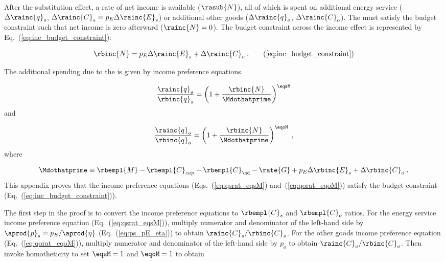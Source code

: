 

After the substitution effect, 
a rate of net income is available ($\rasub{N}$), 
all of which is spent on
additional energy service ($\Delta \rainc{q}_s$, $\Delta \rainc{C}_s = p_E \Delta \rainc{E}_s$) or 
additional other goods ($\Delta \rainc{q}_o$, $\Delta \rainc{C}_o$).
The \inceffect{} must satisfy the budget constraint
such that net income is zero afterward ($\rainc{N} = 0$).
The budget constraint across the income effect 
is represented by Eq.~(\ref{eq:inc_budget_constraint}): 

\begin{equation}
  \rbinc{N} = p_E \Delta \rainc{E}_s + \Delta \rainc{C}_o \; . \tag{\ref{eq:inc_budget_constraint}}
\end{equation}

The additional spending due to the \inceffect{} is given by income preference equations

\begin{equation} \label{eq:qsrat_eqsM}
  \frac{\rainc{q}_s}{\rbinc{q}_s} = \left( 1 + \frac{\rbinc{N}}{\Mdothatprime}  \right) ^{\eqsM}
\end{equation}
%
and

\begin{equation} \label{eq:qorat_eqoM}
  \frac{\rainc{q}_o}{\rbinc{q}_o} = \left( 1 + \frac{\rbinc{N}}{\Mdothatprime}  \right) ^{\eqoM} \; ,
\end{equation}
%
where

\begin{equation} \label{eq:effective_income}
  \Mdothatprime \equiv \rbempl{M} - \rbempl{C}_{cap} - \rbempl{C}_{\md} 
                       - \rate{G} + p_E \Delta \rbinc{E}_s + \Delta \rbinc{C}_o \; .
\end{equation}
%
This appendix proves that the income preference equations 
(Eqs.~(\ref{eq:qsrat_eqsM}) and~(\ref{eq:qorat_eqoM}))
satisfy the budget constraint (Eq.~(\ref{eq:inc_budget_constraint})).

The first step in the proof is to convert 
the income preference equations
to $\rbempl{C}_s$ and $\rbempl{C}_o$ ratios.
For the energy service income preference equation (Eq.~(\ref{eq:qsrat_eqsM})), 
multiply numerator and denominator of the left-hand side by $\aprod{p}_s = p_E / \aprod{\eta}$
(Eq.~(\ref{eq:ps_pE_eta}))
to obtain $\rainc{C}_s / \rbinc{C}_s$.
For the other goods income preference equation (Eq.~(\ref{eq:qorat_eqoM})), 
multiply numerator and denominator of the left-hand side by $p_o$
to obtain $\rainc{C}_o / \rbinc{C}_o$.
Then invoke homotheticity to set $\eqsM = 1$ and $\eqoM = 1$ to obtain


